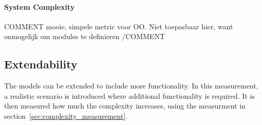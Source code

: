 \paragraph*{System Complexity} COMMENT mooie, simpele metric voor OO. Niet toepasbaar hier, want onmogelijk om modules te definieren $/$COMMENT

\subsection{Extendability}
The models can be extended to include more functionality. In this measurement, a realistic scenario is introduced where additional functionality is required. It is then measured how much the complexity increases, using the measurment in section~\ref{sec:complexity_measurement}.
